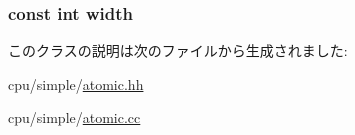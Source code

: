 \label{classAtomicSimpleCPU_aa36b8e894416f0ec98f701ab08f2ac22}
\hypertarget{classAtomicSimpleCPU_a837aabdd54757cb86d0f66387511753f}{
\subsubsection[{width}]{\setlength{\rightskip}{0pt plus 5cm}const int {\bf width}}}
\label{classAtomicSimpleCPU_a837aabdd54757cb86d0f66387511753f}


このクラスの説明は次のファイルから生成されました:\begin{DoxyCompactItemize}
\item 
cpu/simple/\hyperlink{atomic_8hh}{atomic.hh}\item 
cpu/simple/\hyperlink{atomic_8cc}{atomic.cc}\end{DoxyCompactItemize}
